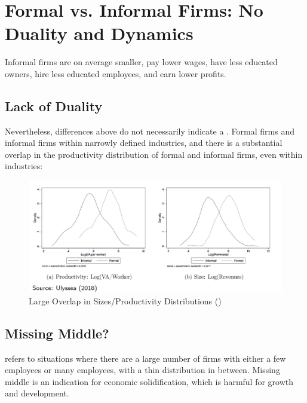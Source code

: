     \section{Formal vs. Informal Firms: No Duality and Dynamics}
            Informal firms are on average smaller, pay lower wages, have less educated owners, hire less educated employees, and earn lower profits.
            
            \subsection{Lack of Duality}
                 Nevertheless, differences above do not necessarily indicate a . Formal firms and informal firms  within narrowly defined industries, and there is a substantial overlap in the productivity distribution of formal and informal firms, even within industries:
                \begin{figure}[H]
                    \centering
                    \includegraphics[width=5.5in]{images/ch5/duality.png}
                    \caption{Large Overlap in Sizes/Productivity Distributions (\cite{ulyssea_firms_2018})}
                \end{figure}
            
            \subsection{Missing Middle?}
                 refers to situations where there are a large number of firms with either a few employees or many employees, with a thin distribution in between. Missing middle is an indication for economic solidification, which is harmful for growth and development.
                
